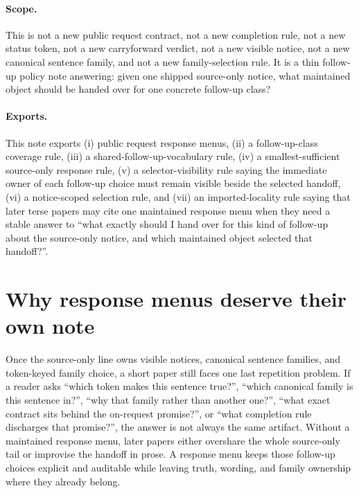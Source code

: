 \documentclass[11pt]{article}
\begin{document}
\paragraph{Scope.}
This is not a new public request contract, not a new completion rule, not a new status token, not a new carryforward verdict, not a new visible notice, not a new canonical sentence family, and not a new family-selection rule.
It is a thin follow-up policy note answering: given one shipped source-only notice, what maintained object should be handed over for one concrete follow-up class?

\paragraph{Exports.}
This note exports (i) public request response menus, (ii) a follow-up-class coverage rule, (iii) a shared-follow-up-vocabulary rule, (iv) a smallest-sufficient source-only response rule, (v) a selector-visibility rule saying the immediate owner of each follow-up choice must remain visible beside the selected handoff, (vi) a notice-scoped selection rule, and (vii) an imported-locality rule saying that later terse papers may cite one maintained response menu when they need a stable answer to ``what exactly should I hand over for this kind of follow-up about the source-only notice, and which maintained object selected that handoff?''.

\section{Why response menus deserve their own note}
Once the source-only line owns visible notices, canonical sentence families, and token-keyed family choice, a short paper still faces one last repetition problem.
If a reader asks ``which token makes this sentence true?'', ``which canonical family is this sentence in?'', ``why that family rather than another one?'', ``what exact contract sits behind the on-request promise?'', or ``what completion rule discharges that promise?'', the answer is not always the same artifact.
Without a maintained response menu, later papers either overshare the whole source-only tail or improvise the handoff in prose.
A response menu keeps those follow-up choices explicit and auditable while leaving truth, wording, and family ownership where they already belong.
\end{document}
